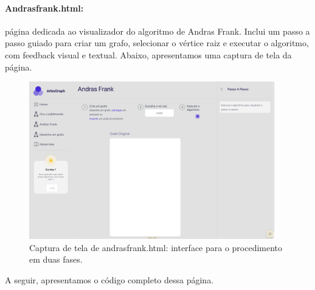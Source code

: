 \documentclass[12pt,a4paper]{article}
\def\texttt#1{#1}%
\begin{document}
\paragraph{\texttt{Andrasfrank.html}:} página dedicada ao visualizador do algoritmo de Andras Frank. Inclui um passo a passo guiado para criar um grafo, selecionar o vértice raiz e executar o algoritmo, com feedback visual e textual. Abaixo, apresentamos uma captura de tela da página.

\begin{figure}[H]\centering
    \includegraphics[width=0.95\textwidth]{../assets/andrasfrankhtml.png}
    \caption{Captura de tela de \texttt{andrasfrank.html}: interface para o procedimento em duas fases.}
    \label{fig:andrasfrank_html_screenshot}
\end{figure}

A seguir, apresentamos o código completo dessa página.
\end{document}

